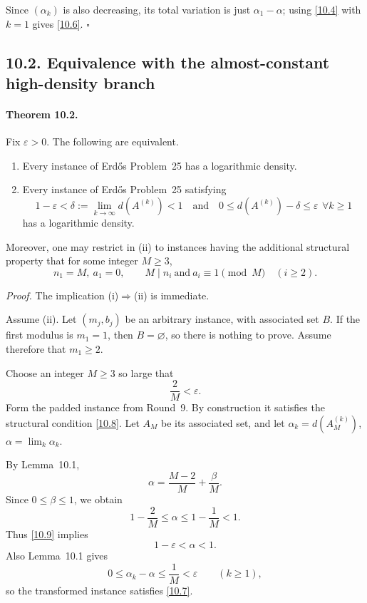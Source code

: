 Since $(\alpha_k)$ is also decreasing, its total variation is just $\alpha_1-\alpha$; using \eqref{10.4} with $k=1$ gives \eqref{10.6}. \hfill $\square$

\subsection*{10.2. Equivalence with the almost-constant high-density branch}
\paragraph{Theorem 10.2.}
Fix $\varepsilon>0$.  The following are equivalent.
\begin{enumerate}
\item[(i)] Every instance of Erd\H{o}s Problem~25 has a logarithmic density.
\item[(ii)] Every instance of Erd\H{o}s Problem~25 satisfying
\begin{equation}
1-\varepsilon<\delta:=\lim_{k\to\infty} d(A^{(k)})<1
\quad\text{and}\quad
0\le d(A^{(k)})-\delta\le \varepsilon\ \,\forall k\ge 1
\tag{10.7}
\end{equation}
has a logarithmic density.
\end{enumerate}
Moreover, one may restrict in \textup{(ii)} to instances having the additional structural property that for some integer $M\ge 3$,
\begin{equation}
 n_1=M,\ a_1=0,
 \qquad
 M\mid n_i\ \text{and}\ a_i\equiv 1\pmod M\quad (i\ge 2).
\tag{10.8}
\end{equation}

\emph{Proof.}
The implication (i)$\Rightarrow$(ii) is immediate.

Assume (ii).  Let $(m_j,b_j)$ be an arbitrary instance, with associated set $B$.  If the first modulus is $m_1=1$, then $B=\varnothing$, so there is nothing to prove.  Assume therefore that $m_1\ge 2$.

Choose an integer $M\ge 3$ so large that
\begin{equation}
\frac{2}{M}<\varepsilon.
\tag{10.9}
\end{equation}
Form the padded instance from Round~9.  By construction it satisfies the structural condition \eqref{10.8}.  Let $A_M$ be its associated set, and let $\alpha_k=d(A_M^{(k)})$, $\alpha=\lim_k \alpha_k$.

By Lemma~10.1,
\[
\alpha=\frac{M-2}{M}+\frac{\beta}{M}.
\]
Since $0\le \beta\le 1$, we obtain
\begin{equation}
1-\frac{2}{M}\le \alpha\le 1-\frac{1}{M}<1.
\tag{10.10}
\end{equation}
Thus \eqref{10.9} implies
\begin{equation}
1-\varepsilon<\alpha<1.
\tag{10.11}
\end{equation}
Also Lemma~10.1 gives
\begin{equation}
0\le \alpha_k-\alpha\le \frac1M<\varepsilon
\qquad (k\ge 1),
\tag{10.12}
\end{equation}
so the transformed instance satisfies \eqref{10.7}.

